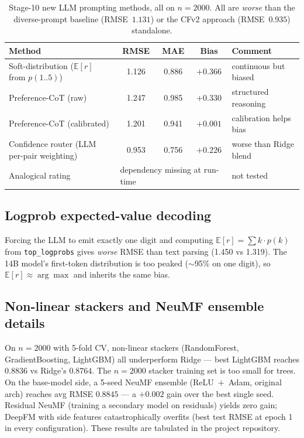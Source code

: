 \documentclass[11pt,a4paper]{article}
\newcommand{\best}[1]{\textcolor{goodgreen}{\textbf{#1}}}
\newcommand{\worst}[1]{\textcolor{badred}{#1}}
\begin{document}
\begin{table}[H]
\centering
\small
\caption{Stage-10 new LLM prompting methods, all on $n{=}2000$. All are
\emph{worse} than the diverse-prompt baseline (RMSE~$1.131$) or the CFv2
approach (RMSE~$0.935$) standalone.}
\label{tab:new_llm_methods}
\begin{tabularx}{\linewidth}{Xcccl}
\toprule
Method & RMSE & MAE & Bias & Comment \\ \midrule
Soft-distribution ($\mathbb{E}[r]$ from $p(1..5)$) & 1.126 & 0.886 & $+0.366$ & continuous but biased \\
Preference-CoT (raw)                                & 1.247 & 0.985 & $+0.330$ & structured reasoning \\
Preference-CoT (calibrated)                         & 1.201 & 0.941 & \best{$+0.001$} & calibration helps bias \\
Confidence router (LLM per-pair weighting)          & \worst{0.953} & 0.756 & $+0.226$ & worse than Ridge blend \\
Analogical rating                                    & \multicolumn{3}{l}{dependency missing at run-time} & not tested \\
\bottomrule
\end{tabularx}
\end{table}

\subsection{Logprob expected-value decoding}
Forcing the LLM to emit exactly one digit and computing
$\mathbb{E}[r] = \sum k\cdot p(k)$ from \texttt{top\_logprobs} gives
\emph{worse} RMSE than text parsing (1.450 vs 1.319). The 14B model's
first-token distribution is too peaked ($\sim$95\% on one digit), so
$\mathbb{E}[r] \approx \arg\max$ and inherits the same bias.

\subsection{Non-linear stackers and NeuMF ensemble details}
On $n=2000$ with 5-fold CV, non-linear stackers (RandomForest, GradientBoosting,
LightGBM) all underperform Ridge --- best LightGBM reaches $0.8836$ vs Ridge's
$0.8764$. The $n{=}2000$ stacker training set is too small for trees. On the
base-model side, a 5-seed NeuMF ensemble (ReLU~$+$~Adam, original arch) reaches
avg RMSE $0.8845$ --- a $+0.002$ gain over the best single seed. Residual
NeuMF (training a secondary model on residuals) yields zero gain; DeepFM with
side features catastrophically overfits (best test RMSE at epoch 1 in every
configuration). These results are tabulated in the project repository.
\end{document}
